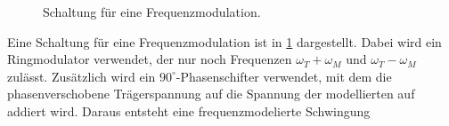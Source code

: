 \begin{figure}
	\centering
	\caption{Schaltung für eine Frequenzmodulation.\cite{V59}\label{fig:Schaltung_Frequenzmodlation}}
\end{figure}
Eine Schaltung für eine Frequenzmodulation ist in \cref{fig:Schaltung_Frequenzmodlation} dargestellt.
Dabei wird ein Ringmodulator verwendet, der nur noch Frequenzen $\omega_T+\omega_M$ und $\omega_T-\omega_M$ zulässt.
Zusätzlich wird ein $90^\circ$-Phasenschifter verwendet, mit dem die phasenverschobene Trägerspannung auf die Spannung der modellierten auf addiert wird.
Daraus entsteht eine frequenzmodelierte Schwingung

\newpage
